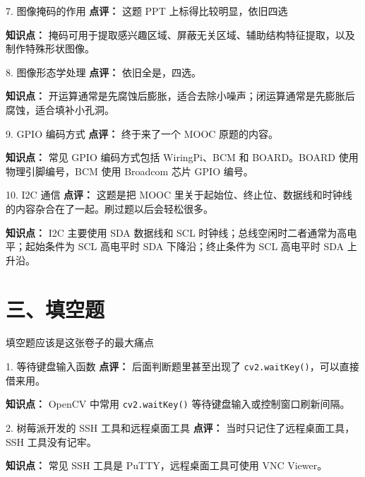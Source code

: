 \begin{question}{7. 图像掩码的作用}
\textbf{点评：} 这题 PPT 上标得比较明显，依旧四选

\textbf{知识点：} 掩码可用于提取感兴趣区域、屏蔽无关区域、辅助结构特征提取，以及制作特殊形状图像。
\end{question}

\begin{question}{8. 图像形态学处理}
\textbf{点评：} 依旧全是，四选。

\textbf{知识点：} 开运算通常是先腐蚀后膨胀，适合去除小噪声；闭运算通常是先膨胀后腐蚀，适合填补小孔洞。
\end{question}

\begin{question}{9. GPIO 编码方式}
\textbf{点评：} 终于来了一个 MOOC 原题的内容。

\textbf{知识点：} 常见 GPIO 编码方式包括 WiringPi、BCM 和 BOARD。BOARD 使用物理引脚编号，BCM 使用 Broadcom 芯片 GPIO 编号。
\end{question}

\begin{question}{10. I2C 通信}
\textbf{点评：} 这题是把 MOOC 里关于起始位、终止位、数据线和时钟线的内容杂合在了一起。刷过题以后会轻松很多。

\textbf{知识点：} I2C 主要使用 SDA 数据线和 SCL 时钟线；总线空闲时二者通常为高电平；起始条件为 SCL 高电平时 SDA 下降沿；终止条件为 SCL 高电平时 SDA 上升沿。
\end{question}

\section{三、填空题}

填空题应该是这张卷子的最大痛点

\begin{question}{1. 等待键盘输入函数}
\textbf{点评：} 后面判断题里甚至出现了 \texttt{cv2.waitKey()}，可以直接借来用。

\textbf{知识点：} OpenCV 中常用 \texttt{cv2.waitKey()} 等待键盘输入或控制窗口刷新间隔。
\end{question}

\begin{question}{2. 树莓派开发的 SSH 工具和远程桌面工具}
\textbf{点评：} 当时只记住了远程桌面工具，SSH 工具没有记牢。

\textbf{知识点：} 常见 SSH 工具是 PuTTY，远程桌面工具可使用 VNC Viewer。
\end{question}

